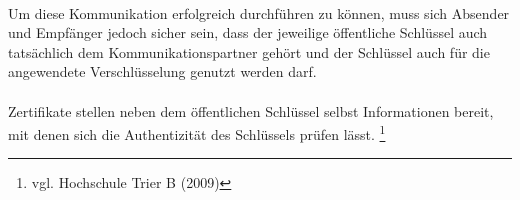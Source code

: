 \\
Um diese Kommunikation erfolgreich durchführen zu können, muss sich Absender und Empfänger jedoch sicher sein, dass der jeweilige öffentliche Schlüssel auch tatsächlich dem Kommunikationspartner gehört und der Schlüssel auch für die angewendete Verschlüsselung genutzt werden darf.\\
\\
Zertifikate stellen neben dem öffentlichen Schlüssel selbst Informationen bereit, mit denen sich die Authentizität des Schlüssels prüfen lässt. \footnote{vgl. Hochschule Trier B (2009)}
